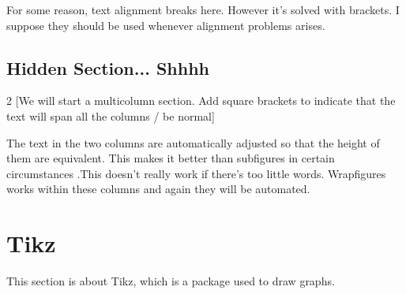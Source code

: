 \documentclass[a4paper]{report}
\begin{document}
{For some reason, text alignment breaks here. However it's solved with brackets. I suppose they should be used whenever alignment problems arises.\\}

\newpage
\section*{Hidden Section... Shhhh}

\begin{multicols}{2}
	[We will start a multicolumn section. 
	Add square brackets to indicate that the text will span all the columns / be normal]
	
	The text in the two columns are automatically adjusted so that the height of them are equivalent. This makes it better than subfigures in certain circumstances .This doesn't really work if there's too little words. Wrapfigures works within these columns and again they will be automated.\\
\end{multicols}

\newpage

\chapter{Tikz}

This section is about Tikz, which is a package used to draw graphs.\\

\end{document}
